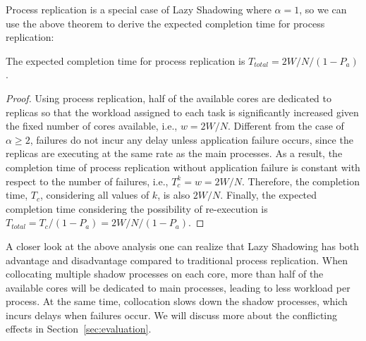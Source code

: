 Process replication is a special case of Lazy Shadowing where $\alpha=1$, so we can use the above theorem to derive the expected completion time for process replication:

\begin{corollary}
The expected completion time for process replication is $T_{total} = 2W/N / (1 - P_a)$.
\end{corollary}
\begin{proof}
Using process replication, half of the available cores are dedicated to replicas so that the workload assigned to each task is significantly increased given the fixed number of cores available, i.e., $w=2W/N$. Different from the case of $\alpha \ge 2$, failures do not incur any delay unless application failure occurs, since the replicas are executing at the same rate as the main processes. As a result, the completion time of process replication without application failure is constant with respect to the number of failures, i.e., $T_c^k=w=2W/N$. Therefore, the completion time, $T_c$, considering all values of $k$, is also $2W/N$. Finally, the expected completion time considering the possibility of re-execution is $T_{total} = T_c / (1 - P_a) = 2W/N / (1 - P_a)$.
\end{proof}

A closer look at the above analysis one can realize that Lazy Shadowing has both advantage and disadvantage compared to traditional process replication. When collocating multiple shadow processes on each core, more than half of the available cores will be dedicated to main processes, leading to less workload per process. At the same time, collocation slows down the shadow processes, which incurs delays when failures occur. We will discuss more about the conflicting effects in Section~\ref{sec:evaluation}.







